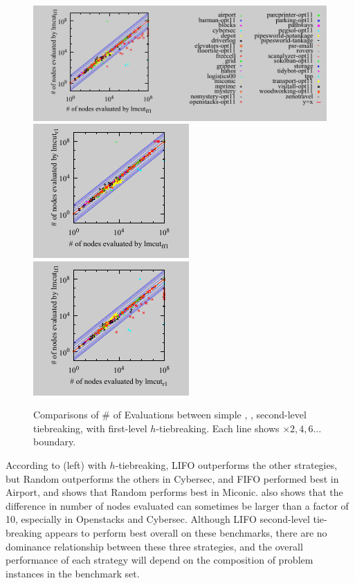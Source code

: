 \begin{figure}[htb]
 \centering {}
 \includegraphics{tables/aaai16-30min/aaai16prelim3/evaluated-lmcut_ff-lmcut_lf.pdf}
 \includegraphics{tables/aaai16-30min/aaai16prelim3/evaluated-nokey-lmcut_ff-lmcut_r.pdf}
 \includegraphics{tables/aaai16-30min/aaai16prelim3/evaluated-nokey-lmcut_r-lmcut_lf.pdf}
 \caption{Comparisons of \# of Evaluations between simple \lifo, \fifo,
 \ro second-level tiebreaking, with first-level $h$-tiebreaking. Each
 line shows $\times 2,4,6\ldots$ boundary.}  \label{f-h-eval}
\end{figure}

According to  (left) with $h$-tiebreaking, LIFO
outperforms the other strategies, but Random outperforms the others in
Cybersec, and FIFO performed best in Airport, and
 shows that Random performs best in Miconic.
 also shows that the difference in number of nodes evaluated can sometimes be larger than a factor of 10,
especially in Openstacks and Cybersec.
Although LIFO second-level tie-breaking appears to perform best overall on these benchmarks, 
there are no dominance relationship between these three strategies, and the overall performance of each strategy will depend on the composition of problem instances in the benchmark set.

